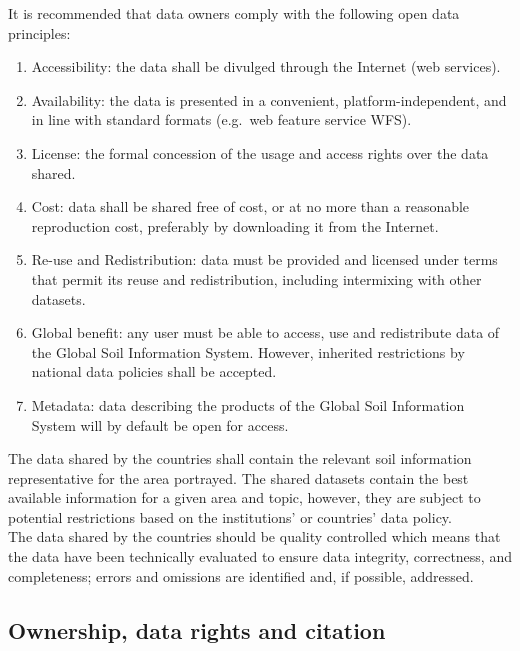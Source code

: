 \documentclass[
  10pt,
  b5paper,
  oneside]{book}
\theoremstyle{definition}
\theoremstyle{definition}
\theoremstyle{definition}
\theoremstyle{definition}
\theoremstyle{remark}
\begin{document}
It is recommended that data owners comply with the following open data
principles:

\begin{enumerate}
\def\labelenumi{\arabic{enumi}.}
\item
  Accessibility: the data shall be divulged through the Internet (web
  services).
\item
  Availability: the data is presented in a convenient,
  platform-independent, and in line with standard formats (e.g.~web
  feature service WFS).
\item
  License: the formal concession of the usage and access rights over
  the data shared.
\item
  Cost: data shall be shared free of cost, or at no more than a
  reasonable reproduction cost, preferably by downloading it from the
  Internet.
\item
  Re-use and Redistribution: data must be provided and licensed under
  terms that permit its reuse and redistribution, including
  intermixing with other datasets.
\item
  Global benefit: any user must be able to access, use and
  redistribute data of the Global Soil Information System. However,
  inherited restrictions by national data policies shall be accepted.
\item
  Metadata: data describing the products of the Global Soil
  Information System will by default be open for access.
\end{enumerate}

The data shared by the countries shall contain the relevant soil
information representative for the area portrayed. The shared datasets
contain the best available information for a given area and topic,
however, they are subject to potential restrictions based on the
institutions' or countries' data policy.\\
The data shared by the countries should be quality controlled which
means that the data have been technically evaluated to ensure data
integrity, correctness, and completeness; errors and omissions are
identified and, if possible, addressed.\\

\hypertarget{ownership-data-rights-and-citation}{%
\subsection{Ownership, data rights and citation}\label{ownership-data-rights-and-citation}}
\end{document}

